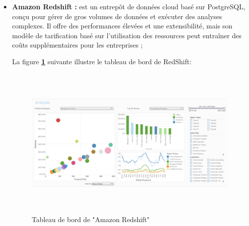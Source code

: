 \begin{itemize}
    \item\textbf{Amazon Redshift :} est un entrepôt de données cloud basé sur PostgreSQL, conçu pour gérer de gros volumes de données et exécuter des analyses complexes.
    Il offre des performances élevées et une extensibilité, mais son modèle de tarification basé sur l'utilisation des ressources peut entraîner des coûts supplémentaires pour les entreprises ;
    \par La figure \textbf{\ref{fig:RS}} suivante illustre le tableau de bord de RedShift:
            \begin{figure}[H]
            \centering
            \includegraphics[width =13cm, height=7.5cm]{img/captures/redshift}
            \caption{Tableau de bord de "Amazon Redshift"}
            \label{fig:RS}
            \end{figure}
\end{itemize}
